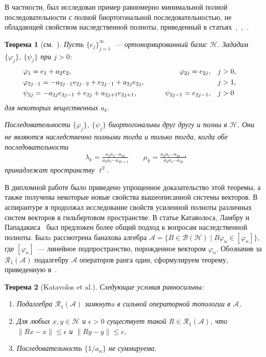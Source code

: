 \documentclass[a4paper,12pt]{article}
\renewcommand{\cal}[1]{\mathcal{#1}}
\renewcommand{\leq}{\leqslant}
\renewcommand{\phi}{\varphi}
\newtheorem{theorem}{Теорема}
\numberwithin{prop_under_lemma}{lemma}
\begin{document}
В частности, был исследован пример равномерно минимальной полной последовательности
с полной биортогональной последовательностью, не обладающей свойством наследственной полноты, приведенный в статьях~\cite{azoff},~\cite{argyroslambrou},~\cite{katavolos}.
\begin{theorem}[см.~\cite{azoff}]
  \label{thm_seq}
  Пусть $\{e_j\}_{j=1}^\infty$~--- ортонормированный базис $\mathcal{H}$. Зададим $\{\phi_j\}$, $\{\psi_j\}$ при $j > 0$:
  \begin{equation}
    \label{main-system}
    \begin{aligned}
      &\phi_1 = e_1 + a_2 e_2, \qquad &\phi_{2j}=e_{2j}, \quad&j > 0,&\\
      &\phi_{2j-1}=-a_{2j-1}e_{2j-2} + e_{2j-1} + a_{2j}e_{2j}, \qquad &\makebox[5em]{} \quad&j > 1,&\\
      &\psi_{2j}=-a_{2j}e_{2j-1}+e_{2j}+a_{2j+1}e_{2j+1}, \qquad &\psi_{2j-1}=e_{2j-1}, \quad&j > 0&
    \end{aligned}
  \end{equation}
  для некоторых вещественных $a_k$.

  Последовательности $\{\phi_j\}$, $\{\psi_j\}$ биортогональны друг другу и полны в $\cal{H}$. Они
  не являются наследственно полными тогда и только тогда, когда обе последовательности
  \begin{equation}
    \label{sequences}
    \begin{aligned}
      &\lambda_k = \frac{a_2 a_4\cdots a_{2k}}{a_3 a_5\cdots a_{2k+1}}\qquad
      \mu_k = \frac{a_3 a_5 \cdots a_{2k - 1}}{a_2 a_4 \cdots a_{2k}}
    \end{aligned}
  \end{equation}
  принадлежат пространству $\ell^2$.
\end{theorem}
В дипломной работе было приведено упрощенное доказательство этой теоремы, а также получены некоторые новые
  свойства вышеописанной системы векторов.
В аспирантуре я продолжал исследование свойств усиленной полноты различных систем векторов
  в гильбертовом пространстве.
В статье Катаволоса, Ламбру и Пападакиса~\cite{katavolos} был предложен более общий подход
  к вопросам наследственной полноты.
Былa рассмотрена банахова алгебра $\cal{A}=\{B\in\cal{B}(\cal{H}) \mid B \phi_n \in [\phi_n]\},$
  где $[\phi_n]$~--- линейное подпространство, порожденное вектором $\phi_n$.
Обозначив за $\cal{R}_1(\cal{A})$ подалгебру $\cal{A}$ операторов ранга один, сформулируем теорему, приведенную в~\cite{katavolos}.
\begin{theorem}[Katavolos et al.]
  \label{thm-katavolos}
  Следующие условия равносильны:
  \begin{enumerate}[label=\textnormal{\textbf{\alph*}}]
    \item \label{linsum} Подалгебра $\cal{R}_1(\cal{A})$ замкнутa в сильной операторной топологии в $\cal{A}$,
    \item Для любых $x, y \in \cal{H}$ и $\epsilon > 0$ существует такой $R\in\cal{R}_1(\cal{A})$,
      что \newline $\|Rx - x\|\leq \epsilon$ и $\|Ry - y\|\leq \epsilon$,
    \item Последовательность $\{1/a_n\}$ не суммируема.
  \end{enumerate}
\end{theorem}
\end{document}
